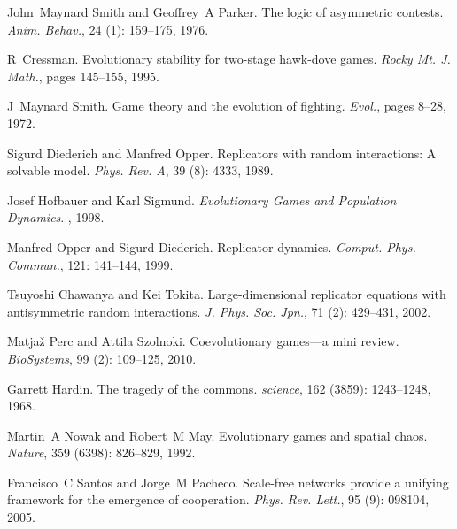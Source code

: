 John~Maynard Smith and Geoffrey~A Parker.
\newblock The logic of asymmetric contests.
\newblock \emph{Anim. Behav.}, 24 (1): 159--175, 1976.

R~Cressman.
\newblock Evolutionary stability for two-stage hawk-dove games.
\newblock \emph{Rocky Mt. J. Math.}, pages 145--155, 1995.

J~Maynard Smith.
\newblock Game theory and the evolution of fighting.
\newblock \emph{Evol.}, pages 8--28, 1972.

Sigurd Diederich and Manfred Opper.
\newblock Replicators with random interactions: {{A}} solvable model.
\newblock \emph{Phys. Rev. A}, 39 (8): 4333, 1989.

Josef Hofbauer and Karl Sigmund.
\newblock \emph{Evolutionary Games and Population Dynamics}.
, 1998.

Manfred Opper and Sigurd Diederich.
\newblock Replicator dynamics.
\newblock \emph{Comput. Phys. Commun.}, 121: 141--144, 1999.

Tsuyoshi Chawanya and Kei Tokita.
\newblock Large-dimensional replicator equations with antisymmetric random
interactions.
\newblock \emph{J. Phys. Soc. Jpn.}, 71 (2): 429--431, 2002.

Matja{\v{z}} Perc and Attila Szolnoki.
\newblock Coevolutionary games—a mini review.
\newblock \emph{BioSystems}, 99 (2): 109--125, 2010.

Garrett Hardin.
\newblock The tragedy of the commons.
\newblock \emph{science}, 162 (3859): 1243--1248, 1968.

Martin~A Nowak and Robert~M May.
\newblock Evolutionary games and spatial chaos.
\newblock \emph{Nature}, 359 (6398): 826--829, 1992.

Francisco~C Santos and Jorge~M Pacheco.
\newblock Scale-free networks provide a unifying framework for the emergence of
cooperation.
\newblock \emph{Phys. Rev. Lett.}, 95 (9): 098104, 2005.

